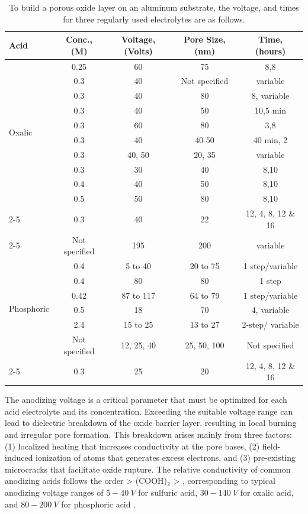 \documentclass{rapportCS}
\begin{document}
	
	\begin{table}[h]
		\caption{To build a porous oxide layer on an aluminum substrate, the voltage, and times for three regularly used electrolytes are as follows.}
		\begin{tabular}{|l|c|c|c|c|}
			\hline
			\textbf{Acid} & \textbf{Conc., (M)} & \textbf{Voltage, (Volts)} & \textbf{Pore Size, (nm)} & \textbf{Time, (hours)} \\ \hline
			\multirow{10}{*}{Oxalic} & 0.25 & 60 & 75 & 8,8 \\ \cline{2-5}
			& 0.3 & 40 & Not specified & variable \\ \cline{2-5}
			& 0.3 & 40 & 80 & 8, variable \\ \cline{2-5}
			& 0.3 & 40 & 50 & 10,5 min \\ \cline{2-5}
			& 0.3 & 60 & 80 & 3,8 \\ \cline{2-5}
			& 0.3 & 40 & 40-50 & 40 min, 2 \\ \cline{2-5}
			& 0.3 & 40, 50 & 20, 35 & variable \\ \cline{2-5}
			& 0.3 & 30 & 40 & 8,10 \\ \cline{2-5}
			& 0.4 & 40 & 50 & 8,10 \\ \cline{2-5}
			& 0.5 & 50 & 80 & 8,10 \\ \cline{2-5}
			& 0.3 & 40 & 22 & 12, 4, 8, 12 \& 16 \\ \cline{2-5}
			& Not specified & 195 & 200 & variable \\ \hline
			\multirow{6}{*}{Phosphoric} & 0.4 & 5 to 40 & 20 to 75 & 1 step/variable \\ \cline{2-5}
			& 0.4 & 80 & 80 & 1 step \\ \cline{2-5}
			& 0.42 & 87 to 117 & 64 to 79 & 1 step/variable \\ \cline{2-5}
			& 0.5 & 18 & 70 & 4, variable \\ \cline{2-5}
			& 2.4 & 15 to 25 & 13 to 27 & 2-step/ variable \\ \hline
			\multirow{3}{*}{Sulfuric} & Not specified & 12, 25, 40 & 25, 50, 100 & Not specified \\ \cline{2-5}
			& 0.3 & 25 & 20 & 12, 4, 8, 12 \& 16 \\ \hline
		\end{tabular}
		\label{tab:acidVolt}
	\end{table}
	
	
	The anodizing voltage is a critical parameter that must be optimized for each acid electrolyte and its concentration. Exceeding the suitable voltage range can lead to dielectric breakdown of the oxide barrier layer, resulting in local burning and irregular pore formation. This breakdown arises mainly from three factors: (1) localized heating that increases conductivity at the pore bases, (2) field-induced ionization of atoms that generates excess electrons, and (3) pre-existing microcracks that facilitate oxide rupture. The relative conductivity of common anodizing acids follows the order  > (COOH)$_2$ > , corresponding to typical anodizing voltage ranges of $5 - 40~V$ for sulfuric acid, $30 - 140~V$ for oxalic acid, and $80 - 200~V$ for phosphoric acid \cite{eessaa2023review}.  
	
\end{document}
